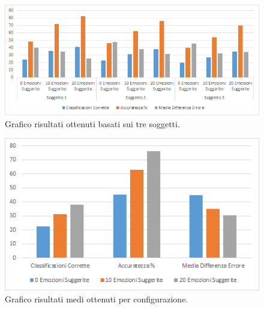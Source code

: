 \documentclass[11pt]{report}
\begin{document}
\begin{figure}[h]
\centering
\includegraphics[scale = 0.85]{img/grafico-tab3.png}
\caption{Grafico risultati ottenuti basati sui tre soggetti.}
\label{fig-data1}
\end{figure}

\vspace{2cm}

\begin{figure}[h]
\centering
\includegraphics[scale = 0.9]{img/grafico-tab4.png}
\caption{Grafico risultati medi ottenuti per configurazione.}
\label{fig-data2}
\end{figure}



\newpage
\end{document}
